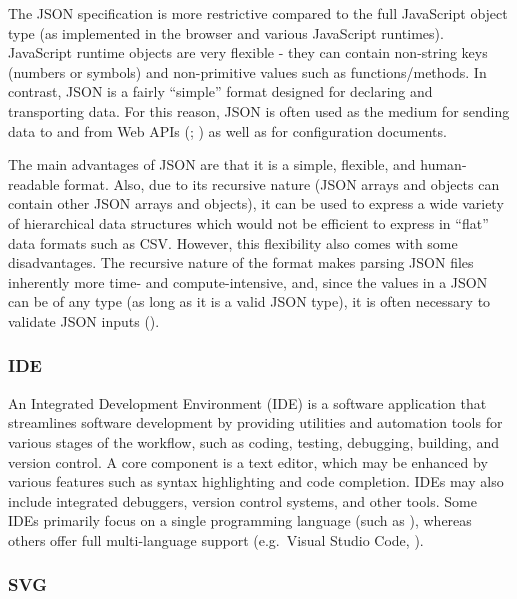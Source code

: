\documentclass[
]{book}
\theoremstyle{definition}
\theoremstyle{definition}
\theoremstyle{definition}
\theoremstyle{definition}
\theoremstyle{remark}
\begin{document}
The JSON specification is more restrictive compared to the full JavaScript object type (as implemented in the browser and various JavaScript runtimes). JavaScript runtime objects are very flexible - they can contain non-string keys (numbers or symbols) and non-primitive values such as functions/methods. In contrast, JSON is a fairly ``simple'' format designed for declaring and transporting data. For this reason, JSON is often used as the medium for sending data to and from Web APIs (; ) as well as for configuration documents.

The main advantages of JSON are that it is a simple, flexible, and human-readable format. Also, due to its recursive nature (JSON arrays and objects can contain other JSON arrays and objects), it can be used to express a wide variety of hierarchical data structures which would not be efficient to express in ``flat'' data formats such as CSV. However, this flexibility also comes with some disadvantages. The recursive nature of the format makes parsing JSON files inherently more time- and compute-intensive, and, since the values in a JSON can be of any type (as long as it is a valid JSON type), it is often necessary to validate JSON inputs ().

\subsubsection{IDE}\label{ide}

An Integrated Development Environment (IDE) is a software application that streamlines software development by providing utilities and automation tools for various stages of the workflow, such as coding, testing, debugging, building, and version control. A core component is a text editor, which may be enhanced by various features such as syntax highlighting and code completion. IDEs may also include integrated debuggers, version control systems, and other tools. Some IDEs primarily focus on a single programming language (such as ), whereas others offer full multi-language support (e.g.~Visual Studio Code, ).

\subsubsection{SVG}\label{svg}
\end{document}
